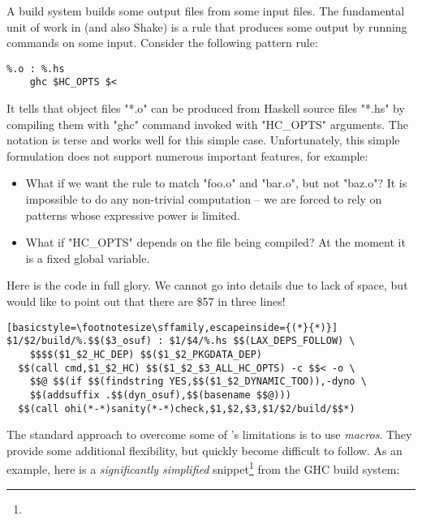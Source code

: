 A build system builds some output files from some input files. The fundamental unit of work in \make{} (and also Shake) is a rule that produces some output by running commands on some input. Consider the following pattern rule:

\begin{lstlisting}
%.o : %.hs
    ghc $HC_OPTS $<
\end{lstlisting}

\noindent It tells \make{} that object files \lst"*.o" can be produced from Haskell source files \lst"*.hs" by compiling them with \lst"ghc" command invoked with \lst"HC_OPTS" arguments. The notation is terse and works well for this simple case. Unfortunately, this simple formulation does not support numerous important features, for example:

\begin{itemize}
\item What if we want the rule to match \lst"foo.o" and \lst"bar.o", but not \lst"baz.o"? It is impossible to do any non-trivial computation -- we are forced to rely on patterns whose expressive power is limited.
\item What if \lst"HC_OPTS" depends on the file being compiled? At the moment it is a fixed global variable.
\end{itemize}

\newsavebox{\exampleCode}
\begin{lrbox}{\exampleCode}
\begin{minipage}[t]{\columnwidth}
Here is the code in full glory. We cannot go into details due to lack of
space, but would like to point out that there are \$57 in three lines!
\begin{lstlisting}[basicstyle=\footnotesize\sffamily,escapeinside={(*}{*)}]
$1/$2/build/%.$$($3_osuf) : $1/$4/%.hs $$(LAX_DEPS_FOLLOW) \
    $$$$($1_$2_HC_DEP) $$($1_$2_PKGDATA_DEP)
  $$(call cmd,$1_$2_HC) $$($1_$2_$3_ALL_HC_OPTS) -c $$< -o \
    $$@ $$(if $$(findstring YES,$$($1_$2_DYNAMIC_TOO)),-dyno \
    $$(addsuffix .$$(dyn_osuf),$$(basename $$@)))
  $$(call ohi(*-*)sanity(*-*)check,$1,$2,$3,$1/$2/build/$$*)
\end{lstlisting}
\end{minipage}
\end{lrbox}

The standard approach to overcome some of \make{}'s limitations is to use
\emph{macros}. They provide some additional flexibility, but quickly become difficult to follow. As an example, here is a \emph{significantly simplified} snippet\footnote{\usebox{\exampleCode}} from the GHC build system:

